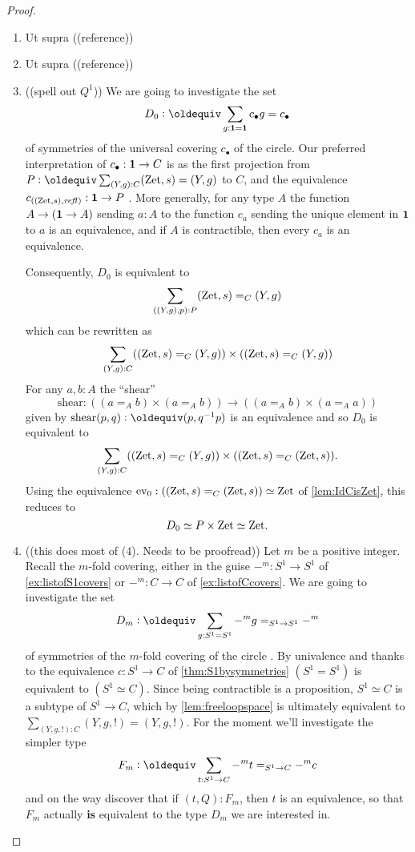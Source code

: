   \begin{proof}
    \begin{enumerate}
    \item Ut supra ((reference))
    \item Ut supra ((reference))
    \item  ((spell out $Q^1$))
We are going to investigate the set 
$$D_0\defequi\sum_{g:\bn 1=\bn 1}c_\bullet g=c_\bullet$$ 
of symmetries of the universal covering $c_\bullet$ of the circle.  
Our preferred interpretation of $c_\bullet:\mathbf{1}\to C$ is as the first projection from $P\defequi\sum_{(Y,g):C}(\zet,s)=(Y,g)$ to $C$, and the equivalence $c_{((\mathrm{Zet},s),\mathop{{\it refl}_{}})}:\mathbf{1}\to P$ %
. 
More generally, for any type $A$ the function $A\to(\mathbf{1}\to A)$ sending $a:A$ to the function $c_a$ sending the unique element in $\mathbf{1}$ to $a$ is an equivalence, and if $A$ is contractible, then every $c_a$ is an equivalence.

   Consequently, $D_0$ is equivalent to
$$\sum_{((Y,g),p):P}(\mathrm{Zet},s)=_C(Y,g)$$ 
which can be rewritten as
$$\sum_{(Y,g):C}((\mathrm{Zet},s)=_C(Y,g))\times((\mathrm{Zet},s)=_C(Y,g))
$$
For any $a,b:A$ the ``shear'' 
$$\mathrm{shear}:((a=_Ab)\times(a=_Ab))\to((a=_Ab)\times(a=_Aa))$$ 
given by $\mathrm{shear}(p,q)\defequi(p,q^{-1}p)$
is an equivalence and
so $D_0$ is equivalent to 
$$\sum_{(Y,g):C}((\mathrm{Zet},s)=_C(Y,g))\times ((\mathrm{Zet},s)=_C(\mathrm{Zet},s)).
$$
Using the equivalence $\mathrm{ev}_0:((\mathrm{Zet},s)=_C(\mathrm{Zet},s))\simeq\mathrm{Zet}$ of \cref{lem:IdCisZet}, this
 reduces to 
$$D_0\simeq P\times\mathrm{Zet}\simeq\mathrm{Zet}.$$
    \item ((this does most of (4).  Needs to be proofread))
    Let $m$ be a positive integer.  
Recall the $m$-fold covering, either in the guise $-^m:S^1\to S^1$ of \cref{ex:listofS1covers} or $-^m:C\to C$ of \cref{ex:listofCcovers}.
We are going to investigate the set
$$D_m\defequi\sum_{g:S^1=S^1}-^mg=_{S^1\to S^1}-^m$$  
of symmetries of the $m$-fold covering of the circle%
.  
By univalence and thanks to the equivalence $c:S^1\to C$ of \cref{thm:S1bysymmetries} $(S^1= S^1)$ is equivalent to $(S^1\simeq C)$.
Since being contractible is a proposition, $S^1\simeq C$ is a subtype of $S^1\to C$,
which by \cref{lem:freeloopspace} is ultimately equivalent to $\sum_{(Y,g,!):C}(Y,g,!)=(Y,g,!)$. 
For the moment we'll investigate the simpler type 
$$F_m\defequi\sum_{t:S^1\to C}-^mt=_{S^1\to C}-^mc$$
and on the way discover that if $(t,Q):F_m$, then $t$ is an equivalence, so that $F_m$ actually {\bf is} equivalent to the type $D_m$ we are interested in.


\end{enumerate}
\end{proof}
